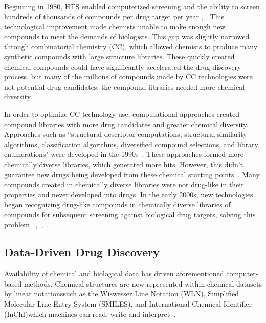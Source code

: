 \documentclass{IEEEtran}
\begin{document}
		Beginning in 1980, HTS enabled computerized screening and the ability to screen hundreds of thousands of compounds per drug target per year \cite{gall}, \cite{hecht}.  This technological improvement made chemists unable to make enough new compounds to meet the demands of biologists.  This gap was slightly narrowed through combinatorial chemistry (CC), which allowed chemists to produce many synthetic compounds with large structure libraries. These quickly created chemical compounds could have significantly accelerated the drug discovery process, but many of the millions of compounds made by CC technologies were not potential drug candidates; the compound libraries needed more chemical diversity.
		
		In order to optimize CC technology use, computational approaches created compound libraries with more drug candidates and greater chemical diversity.  Approaches such as ``structural descriptor computations, structural similarity algorithms, classification algorithms, diversified compound selections, and library enumerations" were developed in the 1990s~\cite{xu}.  These approaches formed more chemically diverse libraries, which generated more hits.  However, this didn't guarantee new drugs being developed from these chemical starting points~\cite{xu}.  Many compounds created in chemically diverse libraries were not drug-like in their properties and never developed into drugs.  In the early 2000s,  new technologies began recognizing drug-like compounds in chemically diverse libraries of compounds for subsequent screening against biological drug targets, solving this problem ~\cite{begam},~\cite{brown},~\cite{xu}.
		
		\subsection{Data-Driven Drug Discovery}
		Availability of chemical and biological data has driven aforementioned computer-based methods.  Chemical structures are now represented within chemical datasets by linear notations\textemdash such as the Wiswesser Line Notation (WLN), Simplified Molecular Line Entry System (SMILES), and International Chemical Identifier (InChI)\textemdash which machines can read, write and interpret~\cite{xu}.
		
\end{document}
